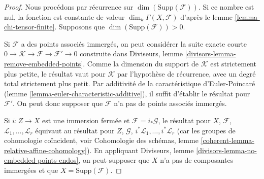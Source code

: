 \begin{proof}
Nous procédons par récurrence sur $\dim(\text{Supp}(\mathcal{F}))$.
Si ce nombre est nul, la fonction est constante de valeur
$\dim_k \Gamma(X, \mathcal{F})$ d'après le lemme \ref{lemma-chi-tensor-finite}.
Supposons que $\dim(\text{Supp}(\mathcal{F})) > 0$.

\medskip\noindent
Si $\mathcal{F}$ a des points associés immergés, on peut considérer
la suite exacte courte
$0 \to \mathcal{K} \to \mathcal{F} \to \mathcal{F}' \to 0$
construite dans Diviseurs, lemme \ref{divisors-lemma-remove-embedded-points}.
Comme la dimension du support de $\mathcal{K}$ est strictement plus petite,
le résultat vaut pour $\mathcal{K}$ par l'hypothèse de récurrence, avec
un degré total strictement plus petit.
Par additivité de la caractéristique d'Euler-Poincaré
(lemme \ref{lemma-euler-characteristic-additive}),
il suffit d'établir le résultat pour $\mathcal{F}'$. On peut donc supposer que
$\mathcal{F}$ n'a pas de points associés immergés.

\medskip\noindent
Si $i : Z \to X$ est une immersion fermée et $\mathcal{F} = i_*\mathcal{G}$,
le résultat pour $X$, $\mathcal{F}$,
$\mathcal{L}_1, \ldots, \mathcal{L}_r$ équivaut au résultat
pour $Z$, $\mathcal{G}$, $i^*\mathcal{L}_1, \ldots, i^*\mathcal{L}_r$
(car les groupes de cohomologie coïncident, voir
Cohomologie des schémas, lemme \ref{coherent-lemma-relative-affine-cohomology}).
En appliquant Diviseurs, lemme \ref{divisors-lemma-no-embedded-points-endos},
on peut supposer que $X$ n'a pas de composantes immergées et que
$X = \text{Supp}(\mathcal{F})$.


\end{proof}
